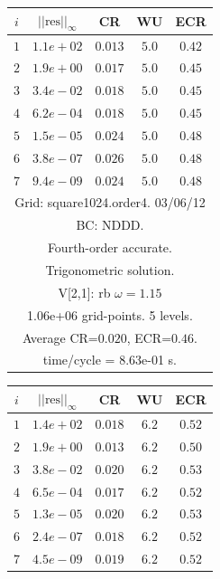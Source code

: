 \begin{table}[hbt]
\begin{center}
{\tablefontsize
\begin{tabular}{|c|c|c|c|c|} \hline 
 $i$   & $\vert\vert\mbox{res}\vert\vert_\infty$  &  CR     &  WU    & ECR  \\   \hline 
 $ 1$  & $ 1.1e+02$ & $0.013$ & $ 5.0$ & $0.42$ \\ 
 $ 2$  & $ 1.9e+00$ & $0.017$ & $ 5.0$ & $0.45$ \\ 
 $ 3$  & $ 3.4e-02$ & $0.018$ & $ 5.0$ & $0.45$ \\ 
 $ 4$  & $ 6.2e-04$ & $0.018$ & $ 5.0$ & $0.45$ \\ 
 $ 5$  & $ 1.5e-05$ & $0.024$ & $ 5.0$ & $0.48$ \\ 
 $ 6$  & $ 3.8e-07$ & $0.026$ & $ 5.0$ & $0.48$ \\ 
 $ 7$  & $ 9.4e-09$ & $0.024$ & $ 5.0$ & $0.48$ \\ 
\hline 
\multicolumn{5}{|c|}{Grid: square1024.order4. 03/06/12}  \\
\multicolumn{5}{|c|}{BC: NDDD.}  \\
\multicolumn{5}{|c|}{Fourth-order accurate.}  \\
\multicolumn{5}{|c|}{Trigonometric solution.}  \\
\multicolumn{5}{|c|}{V[2,1]: rb $\omega=1.15$}  \\
\multicolumn{5}{|c|}{1.06e+06 grid-points. 5 levels.}  \\
\multicolumn{5}{|c|}{Average CR=$0.020$, ECR=$0.46$.}  \\
\multicolumn{5}{|c|}{time/cycle = 8.63e-01 s.}  \\
\hline 
\end{tabular}
\begin{tabular}{|c|c|c|c|c|} \hline 
 $i$   & $\vert\vert\mbox{res}\vert\vert_\infty$  &  CR     &  WU    & ECR  \\   \hline 
 $ 1$  & $ 1.4e+02$ & $0.018$ & $ 6.2$ & $0.52$ \\ 
 $ 2$  & $ 1.9e+00$ & $0.013$ & $ 6.2$ & $0.50$ \\ 
 $ 3$  & $ 3.8e-02$ & $0.020$ & $ 6.2$ & $0.53$ \\ 
 $ 4$  & $ 6.5e-04$ & $0.017$ & $ 6.2$ & $0.52$ \\ 
 $ 5$  & $ 1.3e-05$ & $0.020$ & $ 6.2$ & $0.53$ \\ 
 $ 6$  & $ 2.4e-07$ & $0.018$ & $ 6.2$ & $0.52$ \\ 
 $ 7$  & $ 4.5e-09$ & $0.019$ & $ 6.2$ & $0.52$ \\ 

\end{tabular}}
\end{center}
\end{table}
